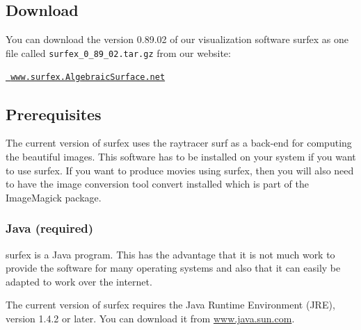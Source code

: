 \documentclass{article}
\newcommand{\surfex}{{\sc surfex}}
\newcommand{\curver}{0.89.02 }
\newcommand{\curverfile}{0\_89\_02}
\begin{document}
%
\subsection{Download}

You can download the version \curver of our visualization software {\sc
  surfex} as one file called {\tt surfex\_\curverfile.tar.gz} from our website:  
\begin{center}
\href{http://www.surfex.AlgebraicSurface.net}{\tt
  www.surfex.AlgebraicSurface.net}
\end{center}


%
\subsection{Prerequisites}

The current version of \surfex{}
uses the raytracer {\sc surf} as a back-end for computing the beautiful
images.  
This software has to be installed on your system if you want to use
\surfex{}. 
If you want to produce movies using \surfex{}, 
then you will also need to have the image conversion tool {\sc convert}
installed which is part of the {\sc ImageMagick} package. 


%
\subsubsection{{\sc Java} (required)}

\surfex{} is a {\sc Java} program. 
This has the advantage that it is not much work to provide the software for
many operating systems and also that it can easily be adapted to work over the
internet. 

The current version of \surfex{} requires the Java Runtime Environment
(JRE), version 1.4.2 or later. 
You can download it from \href{http://www.java.sun.com}{www.java.sun.com}. 


%
\end{document}
